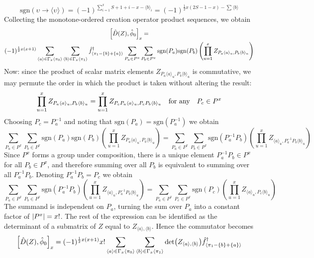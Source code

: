 \documentclass[12pt]{article}
\newcommand{\sgn}{\text{sgn}}
\newcommand{\seq}[1]{\langle #1\rangle}
\newcommand{\hc}{^\dagger}
\newcommand{\inv}{^{-1}}
\begin{document}
	\begin{equation}
	\sgn(\upsilon\to\seq{\upsilon})=(-1)^{\sum_{i=1}^x S+1+i-x-\seq{b}_i}=(-1)^{\frac{1}{2}x(2S-1-x)-\sum\seq{b}}
	\end{equation}
	Collecting the monotone-ordered creation operator product sequences, we obtain
	\begin{multline}
	\comm{\hat{D}(Z)}{\hat{\phi}_0}_x=\\
	(-1)^{\frac{1}{2}x(x+1)}\sum_{\seq{a}\in\Gamma_x\seq{\pi_0}}\sum_{\seq{b}\in\Gamma_x\seq{\pi_1}}\hat{f}\hc_{\seq{\pi_1-\{b\}+\{a\}}}\sum_{P_a\in P^x}\sum_{P_b\in P^x}\sgn(P_a)\sgn(P_b)\left(\prod_{u=1}^x Z_{P_a\seq{a}_u,P_b\seq{b}_u}\right)
	\end{multline}
	Now: since the product of scalar matrix elements $Z_{P_a\seq{a}_u,P_b\seq{b}_u}$ is commutative, we may permute the order in which the product is taken without altering the result:
	\begin{equation}
	\prod_{u=1}^x Z_{P_a\seq{a}_u,P_b\seq{b}_u}=\prod_{u=1}^x Z_{P_cP_a\seq{a}_u,P_cP_b\seq{b}_u}\qq{for any}P_c\in P^x
	\end{equation}
	Choosing $P_c=P_a\inv$ and noting that $\sgn(P_a)=\sgn(P_a\inv)$ we obtain
	\begin{equation}
	\sum_{P_a\in P^x}\sum_{P_b\in P^x}\sgn(P_a)\sgn(P_b)\left(\prod_{u=1}^x Z_{P_a\seq{a}_u,P_b\seq{b}_u}\right)=	\sum_{P_a\in P^x}\sum_{P_b\in P^x}\sgn(P_a\inv P_b)\left(\prod_{u=1}^x Z_{\seq{a}_u,P_a\inv P_b\seq{b}_u}\right)
	\end{equation}
	Since $P^x$ forms a group under composition, there is a unique element $P_a\inv P_b\in P^x$ for all $P_b\in P^x$, and therefore summing over all $P_b$ is equivalent to summing over all $P_a\inv P_b$. Denoting $P_a\inv P_b=P_c$ we obtain
	\begin{equation}
	\sum_{P_a\in P^x}\sum_{P_b\in P^x}\sgn(P_a\inv P_b)\left(\prod_{u=1}^x Z_{\seq{a}_u,P_a\inv P_b\seq{b}_u}\right) = \sum_{P_a\in P^x}\sum_{P_c\in P^x}\sgn(P_c)\left(\prod_{u=1}^x Z_{\seq{a}_u,P_c\seq{b}_u}\right)
	\end{equation}
	The summand is independent on $P_a$, turning the sum over $P_a$ into a constant factor of $\abs{P^x}=x!$. The rest of the expression can be identified as the determinant of a submatrix of $Z$ equal to $Z_{\seq{a},\seq{b}}$. Hence the commutator becomes
	\begin{equation}\label{eq:general commutator}
	\comm{\hat{D}(Z)}{\hat{\phi}_0}_x=
	(-1)^{\frac{1}{2}x(x+1)}x!\sum_{\seq{a}\in\Gamma_x\seq{\pi_0}}\sum_{\seq{b}\in\Gamma_x\seq{\pi_1}}\det(Z_{\seq{a},\seq{b}})\hat{f}\hc_{\seq{\pi_1-\{b\}+\{a\}}}
	\end{equation}
\end{document}
